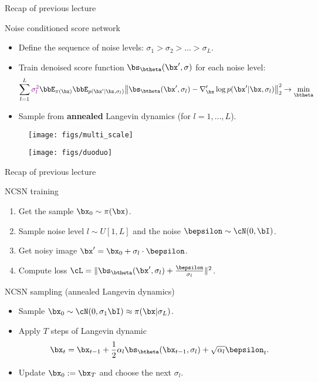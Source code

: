 \begin{frame}{Recap of previous lecture}
	\begin{block}{Noise conditioned score network}
		\begin{itemize}
			\item Define the sequence of noise levels: $\sigma_1 > \sigma_2 > \dots > \sigma_L$.
			\item Train denoised score function $\bs_{\btheta}(\bx', \sigma)$ for each noise level:
			\vspace{-0.3cm}
			\[
				\sum_{l=1}^L {\color{violet}\sigma_l^2} \bbE_{\pi(\bx)} \bbE_{p(\bx' | \bx, \sigma_l)}\bigl\| \bs_{\btheta}(\bx', \sigma_l) - \nabla_\bx' \log p(\bx' | \bx, \sigma_l) \bigr\|^2_2 \rightarrow \min_{\btheta}
			\]
			\vspace{-0.5cm}
			\item Sample from \textbf{annealed} Langevin dynamics (for $l=1, \dots, L$).
		\end{itemize}
	\end{block}
	\begin{figure}
		\texttt{[image: figs/multi\_scale]}
	\end{figure}
	\begin{figure}
		\texttt{[image: figs/duoduo]}
	\end{figure}
\end{frame}
\begin{frame}{Recap of previous lecture}
	\begin{block}{NCSN training}
		\begin{enumerate}
			\item Get the sample $\bx_0 \sim \pi(\bx)$.
			\item Sample noise level $l \sim U[1, L]$ and the noise $\bepsilon \sim \cN(0, \bI)$.
			\item Get noisy image $\bx' = \bx_0 + \sigma_l \cdot \bepsilon$.
			\item Compute loss $ \cL = \| \bs_{\btheta}(\bx', \sigma_l) + \frac{\bepsilon}{\sigma_l} \|^2 $.
		\end{enumerate}
	\end{block}
	\begin{block}{NCSN sampling (annealed Langevin dynamics)}
		\begin{itemize}
			\item Sample $\bx_0 \sim \cN(0, \sigma_1 \bI) \approx \pi(\bx | \sigma_L)$.
			\item Apply $T$ steps of Langevin dynamic
			\vspace{-0.2cm}
			\[
				\bx_t = \bx_{t-1} + \frac{1}{2}\alpha_l \bs_{\btheta}(\bx_{t - 1}, \sigma_l) + \sqrt{\alpha_l} \bepsilon_t.
			\] 
			\vspace{-0.5cm}
			\item Update $\bx_0 := \bx_T$ and choose the next $\sigma_l$.
		\end{itemize}
	\end{block}
\end{frame}
